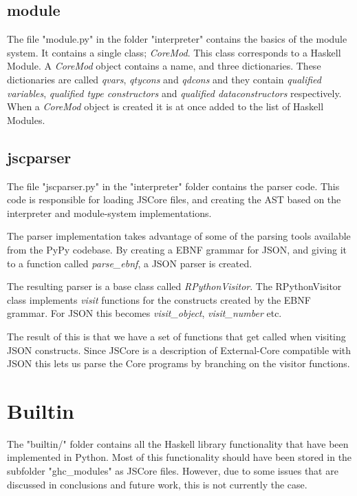 \subsection{module}

The file "module.py" in the folder "interpreter" contains the basics of the
module system. It contains a single class; \emph{CoreMod}. This class corresponds
to a Haskell Module. A \emph{CoreMod} object contains a name, and three dictionaries.
These dictionaries are called \emph{qvars}, \emph{qtycons} and \emph{qdcons} and they
contain \emph{qualified variables}, \emph{qualified type constructors} and 
\emph{qualified dataconstructors} respectively. When a \emph{CoreMod} object is created
it is at once added to the list of Haskell Modules.

\subsection{jscparser}

The file "jscparser.py" in the "interpreter" folder contains the parser code. 
This code is responsible for loading JSCore files, and creating the AST based 
on the interpreter and module-system implementations.

The parser implementation takes advantage of some of the parsing tools 
available from
the PyPy codebase. By creating a EBNF grammar for JSON, and giving it to a 
function called \emph{parse\_ebnf}, a JSON parser is created.

The resulting parser is a base class called \emph{RPythonVisitor}. The 
RPythonVisitor
class implements \emph{visit} functions for the constructs created by the 
EBNF grammar. For JSON this becomes \emph{visit\_object}, 
\emph{visit\_number} etc.

The result of this is that we have a set of functions that get called when 
visiting JSON constructs. Since JSCore is a description of External-Core 
compatible with JSON this lets us parse the Core programs by branching 
on the visitor functions.


\section{Builtin}

The "builtin/" folder contains all the Haskell library functionality that
have been implemented in Python. Most of this functionality should have been
stored in the subfolder "ghc\_modules" as JSCore files. However, due to some 
issues that are discussed in conclusions and future work, this is not currently
the case.

